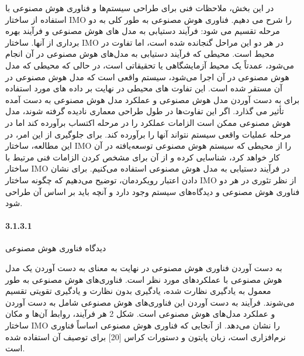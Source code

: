 \documentclass[a4paper,10pt]{article}
\begin{document}
                در این بخش، ملاحظات فنی برای طراحی سیستم‌ها و فناوری هوش مصنوعی با استفاده از ساختار IMO را شرح می دهیم. فناوری هوش مصنوعی به طور کلی به دو مرحله تقسیم می شود: فرآیند دستیابی به مدل های هوش مصنوعی و فرآیند بهره برداری از آنها. ساختار IMO در هر دو این مراحل گنجانده شده است، اما تفاوت در محیط است. محیطی که فرآیند دستیابی به مدل‌های هوش مصنوعی در آن انجام می‌شود، عمدتاً یک محیط آزمایشگاهی یا تحقیقاتی است، در حالی که محیطی که مدل هوش مصنوعی در آن اجرا می‌شود، سیستم واقعی است که مدل هوش مصنوعی در آن مستقر شده است. این تفاوت های محیطی در نهایت بر داده های مورد استفاده برای به دست آوردن مدل هوش مصنوعی و عملکرد مدل هوش مصنوعی به دست آمده تأثیر می گذارد. اگر این تفاوت‌ها در طول طراحی معماری نادیده گرفته شوند، مدل هوش مصنوعی ممکن است الزامات عملکرد را در مرحله اکتساب برآورده کند اما در مرحله عملیات واقعی سیستم نتواند آنها را برآورده کند. برای جلوگیری از این امر، در این مطالعه، ساختار IMO را از محیطی که سیستم هوش مصنوعی توسعه‌یافته در آن کار خواهد کرد، شناسایی کرده و از آن برای مشخص کردن الزامات فنی مرتبط با ساختار IMO در فرآیند دستیابی به مدل هوش مصنوعی استفاده می‌کنیم. برای نشان دادن اعتبار رویکردمان، توضیح می‌دهیم که چگونه ساختار IMO از نظر تئوری در هر دو فناوری هوش مصنوعی و دیدگاه‌های سیستم وجود دارد و آنچه باید بر اساس آن طراحی شود.

                \paragraph*{3.1.3.1}{دیدگاه فناوری هوش مصنوعی}
                
                    به دست آوردن فناوری هوش مصنوعی در نهایت به معنای به دست آوردن یک مدل هوش مصنوعی با عملکردهای مورد نظر است. فناوری‌های هوش مصنوعی به طور معمول به یادگیری نظارت شده، یادگیری بدون نظارت و یادگیری تقویتی تقسیم می‌شوند. فرآیند به دست آوردن این فناوری‌های هوش مصنوعی شامل به دست آوردن و عملکرد مدل‌های هوش مصنوعی است. شکل 2 هر فرآیند، روابط آن‌ها و مکان ساختار IMO را نشان می‌دهد. از آنجایی که فناوری هوش مصنوعی اساساً فناوری نرم‌افزاری است، زبان پایتون و دستورات کراس [20] برای توصیف آن استفاده شده است.
\end{document}
